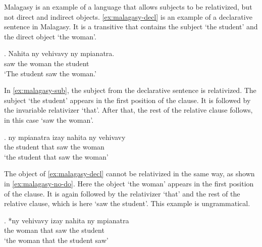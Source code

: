 Malagasy is an example of a language that allows subjects to be relativized, but not direct and indirect objects. \ref{ex:malagasy-decl} is an example of a declarative sentence in Malagasy. It is a transitive that contains the subject  `the student' and the direct object  `the woman'.

\exg. Nahita ny vehivavy ny mpianatra.\\
 saw the woman the student\\
 `The student saw the woman.' \label{ex:malagasy-decl}

In \ref{ex:malagasy-sub}, the subject from the declarative sentence is relativized. The subject  `the student' appears in the first position of the clause. It is followed by the invariable relativizer  `that'. After that, the rest of the relative clause follows, in this case  `saw the woman'.

\exg. ny mpianatra izay nahita ny vehivavy\\
 the student that saw the woman\\
 `the student that saw the woman' \label{ex:malagasy-sub}

The object of \ref{ex:malagasy-decl} cannot be relativized in the same way, as shown in \ref{ex:malagasy-no-do}. Here the object  `the woman' appears in the first position of the clause. It is again followed by the relativizer  `that' and the rest of the relative clause, which is here  `saw the student'. This example is ungrammatical.

\exg. *ny vehivavy izay nahita ny mpianatra\\
 the woman that saw the student\\
 `the woman that the student saw' \label{ex:malagasy-no-do}

%

